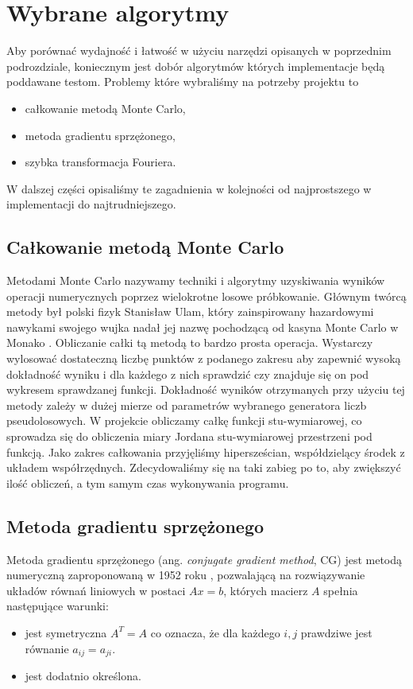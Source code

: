 \documentclass[a4paper,12pt]{book} %
\begin{document}
\section{Wybrane algorytmy}
Aby porównać wydajność i łatwość w użyciu narzędzi opisanych w poprzednim podrozdziale, koniecznym jest dobór algorytmów których implementacje będą poddawane testom. Problemy które wybraliśmy na potrzeby projektu to
\begin{itemize}
\item całkowanie metodą Monte Carlo,
\item metoda gradientu sprzężonego,
\item szybka transformacja Fouriera.
\end{itemize}
W dalszej części opisaliśmy te zagadnienia w kolejności od najprostszego w implementacji do najtrudniejszego.
\subsection{Całkowanie metodą Monte Carlo}
Metodami Monte Carlo nazywamy techniki i algorytmy uzyskiwania wyników operacji numerycznych poprzez wielokrotne losowe próbkowanie. Głównym twórcą metody był polski fizyk Stanisław Ulam, który zainspirowany hazardowymi nawykami swojego wujka nadał jej nazwę pochodzącą od kasyna Monte Carlo w Monako \cite{mc_beggining}.
Obliczanie całki tą metodą to bardzo prosta operacja. Wystarczy wylosować dostateczną liczbę punktów z podanego zakresu aby zapewnić wysoką dokładność wyniku i dla każdego z nich sprawdzić czy znajduje się on pod wykresem sprawdzanej funkcji. Dokładność wyników otrzymanych przy użyciu tej metody zależy w dużej mierze od parametrów wybranego generatora liczb pseudolosowych.
W projekcie obliczamy całkę funkcji stu-wymiarowej, co sprowadza się do obliczenia miary Jordana \cite{miara-jordana} stu-wymiarowej przestrzeni pod funkcją. Jako zakres całkowania przyjęliśmy hipersześcian, współdzielący środek z układem współrzędnych. Zdecydowaliśmy się na taki zabieg po to, aby zwiększyć ilość obliczeń, a tym samym czas wykonywania programu. 
\subsection{Metoda gradientu sprzężonego}
Metoda gradientu sprzężonego (ang. \emph{conjugate gradient method}, CG) jest metodą numeryczną zaproponowaną w 1952 roku \cite{conjugate-gradient}, pozwalającą na rozwiązywanie układów równań liniowych w postaci $Ax = b$, których macierz $A$ spełnia następujące warunki:
\begin{itemize}
\item jest symetryczna $A^T=A$ co oznacza, że dla każdego $i, j$ prawdziwe jest równanie $a_{ij} = a_{ji}.$
\item jest dodatnio określona.
\end{itemize}
\end{document}
